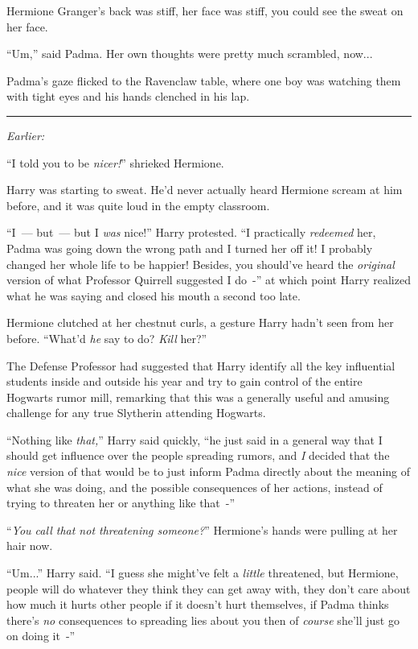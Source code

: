 Hermione Granger's back was stiff, her face was stiff, you could see the sweat on her face.

``Um,'' said Padma. Her own thoughts were pretty much scrambled, now...

Padma's gaze flicked to the Ravenclaw table, where one boy was watching them with tight eyes and his hands clenched in his lap.

\begin{center}\rule{3in}{0.4pt}\end{center}

\emph{Earlier:}

``I told you to be \emph{nicer!}'' shrieked Hermione.

Harry was starting to sweat. He'd never actually heard Hermione scream at him before, and it was quite loud in the empty classroom.

``I~--- but~--- but I \emph{was} nice!'' Harry protested. ``I practically \emph{redeemed} her, Padma was going down the wrong path and I turned her off it! I probably changed her whole life to be happier! Besides, you should've heard the \emph{original} version of what Professor Quirrell suggested I do~-'' at which point Harry realized what he was saying and closed his mouth a second too late.

Hermione clutched at her chestnut curls, a gesture Harry hadn't seen from her before. ``What'd \emph{he} say to do? \emph{Kill} her?''

The Defense Professor had suggested that Harry identify all the key influential students inside and outside his year and try to gain control of the entire Hogwarts rumor mill, remarking that this was a generally useful and amusing challenge for any true Slytherin attending Hogwarts.

``Nothing like \emph{that,}'' Harry said quickly, ``he just said in a general way that I should get influence over the people spreading rumors, and \emph{I} decided that the \emph{nice} version of that would be to just inform Padma directly about the meaning of what she was doing, and the possible consequences of her actions, instead of trying to threaten her or anything like that~-''

``\emph{You call that not threatening someone?}'' Hermione's hands were pulling at her hair now.

``Um...'' Harry said. ``I guess she might've felt a \emph{little} threatened, but Hermione, people will do whatever they think they can get away with, they don't care about how much it hurts other people if it doesn't hurt themselves, if Padma thinks there's \emph{no} consequences to spreading lies about you then of \emph{course} she'll just go on doing it~-''

